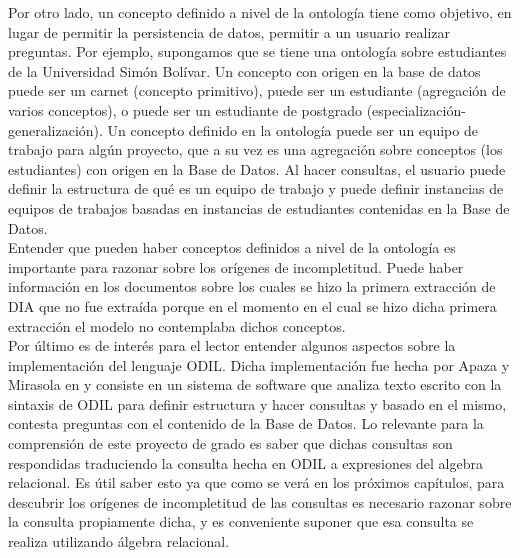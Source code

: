 Por otro lado, un concepto definido a nivel de la ontología tiene como objetivo, en lugar de permitir la persistencia de datos, permitir a un usuario realizar preguntas. Por ejemplo, supongamos que se tiene una ontología sobre estudiantes de la Universidad Simón Bolívar. Un concepto con origen en la base de datos puede ser un carnet (concepto primitivo), puede ser un estudiante (agregación de varios conceptos), o puede ser un estudiante de postgrado (especialización-generalización). Un concepto definido en la ontología puede ser un equipo de trabajo para algún proyecto, que a su vez es una agregación sobre conceptos (los estudiantes) con origen en la Base de Datos. Al hacer consultas, el usuario puede definir la estructura de qué es un equipo de trabajo y puede definir instancias de equipos de trabajos basadas en instancias de estudiantes contenidas en la Base de Datos.\\

Entender que pueden haber conceptos definidos a nivel de la ontología es importante para razonar sobre los orígenes de incompletitud. Puede haber información en los documentos sobre los cuales se hizo la primera extracción de DIA que no fue extraída porque en el momento en el cual se hizo dicha primera extracción el modelo no contemplaba dichos conceptos. \\

Por último es de interés para el lector entender algunos aspectos sobre la implementación del lenguaje ODIL. Dicha implementación fue hecha por Apaza y Mirasola en \cite{ODILImplementation} y consiste en un sistema de software que analiza texto escrito con la sintaxis de ODIL para definir estructura y hacer consultas y basado en el mismo, contesta preguntas con el contenido de la Base de Datos. Lo relevante para la comprensión de este proyecto de grado es saber que dichas consultas son respondidas traduciendo la consulta hecha en ODIL a expresiones del algebra relacional. Es útil saber esto ya que como se verá en los próximos capítulos, para descubrir los orígenes de incompletitud de las consultas es necesario razonar sobre la consulta propiamente dicha, y es conveniente suponer que esa consulta se realiza utilizando álgebra relacional.\\